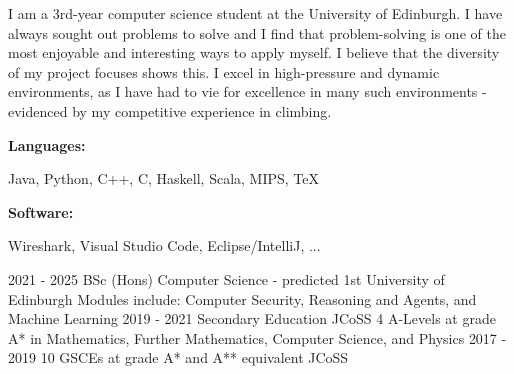 \documentclass[9pt]{developercv} %
\begin{document}
\begin{minipage}[t]{0.56\textwidth}
	\vspace{-6pt}
 
	I am a 3rd-year computer science student at the University of Edinburgh. 
	I have always sought out problems to solve and I find that problem-solving is one of the most enjoyable and interesting ways to apply myself. 
	I believe that the diversity of my project focuses shows this. 
	I excel in high-pressure and dynamic environments, as I have had to vie for excellence in many such environments - evidenced by my competitive experience in climbing.\\
\end{minipage}
\hfill %
\begin{minipage}[t]{0.365\textwidth}
    \vspace{-6pt}
    
    \begin{minipage}[t]{0.15\textwidth}
        \textbf{Languages:}
    \end{minipage}
    \hfill
    \begin{minipage}[t]{0.68\textwidth}
      Java, Python, C++, C, Haskell, Scala, MIPS, TeX
    \end{minipage}
    \vspace{4mm}
    
    \begin{minipage}[t]{0.15\textwidth}
        \textbf{Software:}
    \end{minipage}
    \hfill
    \begin{minipage}[t]{0.68\textwidth}
      Wireshark, Visual Studio Code, Eclipse/IntelliJ, ...
    \end{minipage}
    
\end{minipage}


\vspace{-10 pt}
\begin{entrylist}
    \entry
		{2021 - 2025}
		{BSc (Hons) Computer Science - predicted 1st}
		{University of Edinburgh}
		{Modules include: Computer Security, Reasoning and Agents, and Machine Learning}
    \entry
		{2019 - 2021}
		{Secondary Education}
		{JCoSS}
		{4 A-Levels at grade A* in Mathematics, Further Mathematics, Computer Science, and Physics}
	\entry
		{2017 - 2019}
		{10 GSCEs at grade A* and A** equivalent}
		{JCoSS}
		{ }
\end{entrylist}
\end{document}
